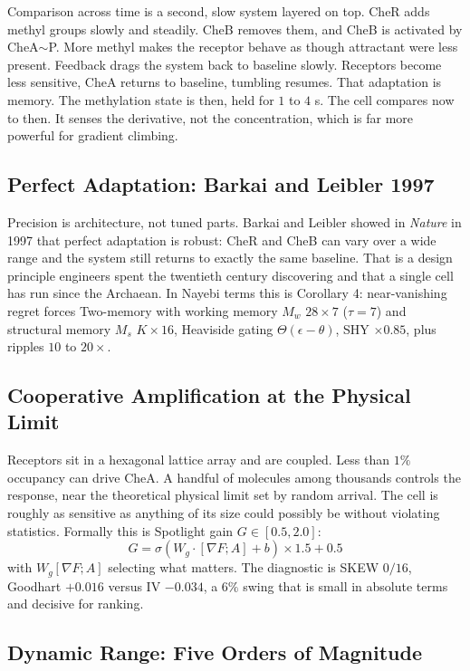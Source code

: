 \documentclass[11pt,a4paper]{article}
\begin{document}
Comparison across time is a second, slow system layered on top. CheR adds methyl groups slowly and steadily. CheB removes them, and CheB is activated by CheA$\sim$P. More methyl makes the receptor behave as though attractant were less present. Feedback drags the system back to baseline slowly. Receptors become less sensitive, CheA returns to baseline, tumbling resumes. That adaptation is memory. The methylation state is then, held for $1$ to $4$ s. The cell compares now to then. It senses the derivative, not the concentration, which is far more powerful for gradient climbing.

\subsection{Perfect Adaptation: Barkai and Leibler 1997}

Precision is architecture, not tuned parts. Barkai and Leibler showed in \textit{Nature} in 1997 that perfect adaptation is robust: CheR and CheB can vary over a wide range and the system still returns to exactly the same baseline. That is a design principle engineers spent the twentieth century discovering and that a single cell has run since the Archaean. In Nayebi terms this is Corollary 4: near-vanishing regret forces Two-memory with working memory $M_w$ $28 \times 7$ ($\tau = 7$) and structural memory $M_s$ $K \times 16$, Heaviside gating $\Theta(\epsilon - \theta)$, SHY $\times 0.85$, plus ripples $10$ to $20\times$.

\subsection{Cooperative Amplification at the Physical Limit}

Receptors sit in a hexagonal lattice array and are coupled. Less than $1\%$ occupancy can drive CheA. A handful of molecules among thousands controls the response, near the theoretical physical limit set by random arrival. The cell is roughly as sensitive as anything of its size could possibly be without violating statistics. Formally this is Spotlight gain $G \in [0.5, 2.0]$:
\begin{equation}
G = \sigma(W_g \cdot [\nabla F; A] + b) \times 1.5 + 0.5
\end{equation}
with $W_g[\nabla F; A]$ selecting what matters. The diagnostic is SKEW $0/16$, Goodhart $+0.016$ versus IV $-0.034$, a $6\%$ swing that is small in absolute terms and decisive for ranking.

\subsection{Dynamic Range: Five Orders of Magnitude}
\end{document}
